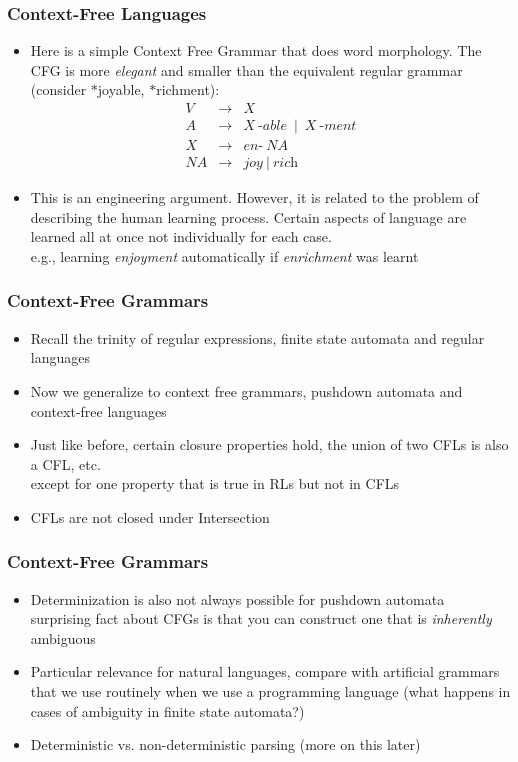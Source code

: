 \begin{frame}
\frametitle{Context-Free Languages}
\begin{itemize}
\item Here is a simple Context Free Grammar that does word
  morphology. The CFG is more {\em elegant} and smaller than the
  equivalent regular grammar (consider $\ast$joyable, $\ast$richment):
\begin{eqnarray}
V &\rightarrow& X \nonumber \\
A &\rightarrow& X\ \textit{-able}~\mid~X\ \textit{-ment}\nonumber \\
X &\rightarrow& \textit{en-}\ NA \nonumber \\
NA &\rightarrow& \textit{joy}~\mid~\textit{rich} \nonumber
\end{eqnarray}
\item This is an engineering argument. However, it is related to the problem of describing the human learning process. Certain aspects of language are learned all at once not individually for each case.\\
{e.g., learning {\em enjoyment} automatically if {\em enrichment} was learnt}
\end{itemize}

\end{frame}

\begin{frame}
\frametitle{Context-Free Grammars}
\begin{itemize}
\item Recall the trinity of regular expressions, finite state automata and regular languages
\item Now we generalize to context free grammars, pushdown automata and context-free languages
\item Just like before, certain closure properties hold, the union of two CFLs is also a CFL, etc. \\
{\color{blue} except for one property that is true in RLs but not in CFLs}
\pause
\item CFLs are not closed under Intersection
\end{itemize}

\end{frame}

\begin{frame}
\frametitle{Context-Free Grammars}
\begin{itemize}
\item Determinization is also not always possible for pushdown automata \\
surprising fact about CFGs is that you can construct one that is {\em inherently} ambiguous\\
\item Particular relevance for natural languages, compare with artificial grammars that we use routinely when we use a programming language (what happens in cases of ambiguity in finite state automata?)
\item Deterministic vs. non-deterministic parsing (more on this later)
\end{itemize}

\end{frame}


